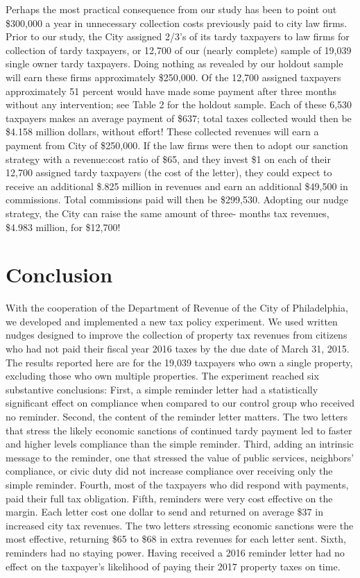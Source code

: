 \documentclass[12pt]{article}
\begin{document}
Perhaps the most practical consequence from our study has been to
point out \$300,000 a year in unnecessary collection costs previously
paid to city law firms.  Prior to our study, the City assigned 2/3's
of its tardy taxpayers to law firms for collection of tardy taxpayers,
or 12,700 of our (nearly complete) sample of 19,039 single owner tardy
taxpayers.  Doing nothing as revealed by our holdout sample will earn
these firms approximately \$250,000.  Of the 12,700 assigned taxpayers
approximately 51 percent would have made some payment after three
months without any intervention; see Table 2 for the holdout sample.
Each of these 6,530 taxpayers makes an average payment of \$637; total
taxes collected would then be \$4.158 million dollars, without effort!
These collected revenues will earn a payment from City of \$250,000.
If the law firms were then to adopt our sanction strategy with a
revenue:cost ratio of \$65, and they invest \$1 on each of their
12,700 assigned tardy taxpayers (the cost of the letter), they could
expect to receive an additional \$.825 million in revenues and earn an
additional \$49,500 in commissions. Total commissions paid will then
be \$299,530.  Adopting our nudge strategy, the City can raise the
same amount of three- months tax revenues, \$4.983 million, for \$12,700!


\section{Conclusion}

With the cooperation of the Department of Revenue of the City of
Philadelphia, we developed and implemented a new tax policy
experiment. We used written nudges designed to improve the collection of
property tax revenues from citizens who had not paid their fiscal year
2016 taxes by the due date of March 31, 2015.  The results reported
here are for the 19,039 taxpayers who own a single property, excluding
those who own multiple properties.  The experiment reached six
substantive conclusions: First, a simple reminder letter had a
statistically significant effect on compliance when compared to our
control group who received no reminder.  Second, the content of the
reminder letter matters.  The two letters that stress the likely
economic sanctions of continued tardy payment led to faster and higher
levels compliance than the simple reminder.  Third, adding an
intrinsic message to the reminder, one that stressed the value of
public services, neighbors' compliance, or civic duty did not increase
compliance over receiving only the simple reminder.  Fourth, most of
the taxpayers who did respond with payments, paid their full tax
obligation.  Fifth, reminders were very cost effective on the margin.
Each letter cost one dollar to send and returned on average \$37 in
increased city tax revenues.  The two letters stressing economic
sanctions were the most effective, returning \$65 to \$68 in extra
revenues for each letter sent.  Sixth, reminders had no staying power.
Having received a 2016 reminder letter had no effect on the taxpayer's
likelihood of paying their 2017 property taxes on time.
\end{document}
